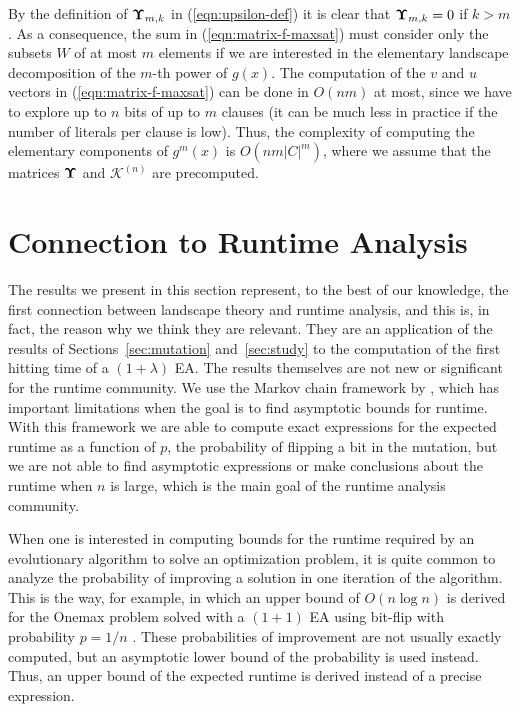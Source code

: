 \documentclass{article}
\def\vec#1{\mathchoice{\mbox{\boldmath$\displaystyle#1$}}
  {\mbox{\boldmath$\textstyle#1$}}
  {\mbox{\boldmath$\scriptstyle#1$}}
  {\mbox{\boldmath$\scriptscriptstyle#1$}}}
\newcommand{\kraw}[1]{\mathcal{K}^{#1}}
\begin{document}
By the definition of $\vec{\Upsilon}_{m,k}$ in (\ref{eqn:upsilon-def}) it is clear that $\vec{\Upsilon}_{m,k}=0$ if $k>m$. As a consequence, the sum in (\ref{eqn:matrix-f-maxsat}) must consider only the subsets $W$ of at most $m$ elements if we are interested in the elementary landscape decomposition of the $m$-th power of $g(x)$. The computation of the $v$ and $u$ vectors in (\ref{eqn:matrix-f-maxsat}) can be done in $O(n m)$ at most, since we have to explore up to $n$ bits of up to $m$ clauses (it can be much less in practice if the number of literals per clause is low). Thus, the complexity of computing the elementary components of $g^m(x)$ is $O(n m |C|^m)$, where we assume that the matrices $\vec{\Upsilon}$ and $\kraw{(n)}$ are precomputed.



\section{Connection to Runtime Analysis}
\label{sec:applications}



The results we present in this section represent, to the best of our knowledge, the first connection between landscape theory and runtime analysis, and this is, in fact, the reason why we think they are relevant. They are an application of the results of Sections~\ref{sec:mutation} and~\ref{sec:study} to the computation of the first hitting time of a $(1+\lambda)$ EA. The results themselves are not new or significant for the runtime community. We use the Markov chain framework by \cite{He:Yao2003}, which has important limitations when the goal is to find asymptotic bounds for runtime. With this framework we are able to compute exact expressions for the expected runtime as a function of $p$, the probability of flipping a bit in the mutation, but we are not able to find asymptotic expressions or make conclusions about the runtime when $n$ is large, which is the main goal of the runtime analysis community.

When one is interested in computing bounds for the runtime required by an evolutionary algorithm to solve an optimization problem, it is quite common to analyze the probability of improving a solution in one iteration of the algorithm. This is the way, for example, in which an upper bound of $O(n \log n)$ is derived for the Onemax problem solved with a $(1+1)$ EA using bit-flip with probability $p=1/n$ \citep[p. 39]{Neumann2010}. These probabilities of improvement are not usually exactly computed, but an asymptotic lower bound of the probability is used instead. Thus, an upper bound of the expected runtime is derived instead of a precise expression.
\end{document}
